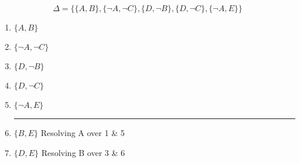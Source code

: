 \documentclass{article}
\begin{document}
 \section{}
 \[\Delta = \{\{A, B\}, \{\lnot A, \lnot C\}, \{D, \lnot B \}, \{D, \lnot C \}, \{\lnot A, E\}\}\]
  \renewcommand{\labelenumi}{\arabic{enumi}.}
 \begin{enumerate}
 \item $\{A, B\}$
 \item $\{\lnot A, \lnot C\}$
 \item $\{D, \lnot B \}$
 \item $\{D, \lnot C \}$
 \item $\{\lnot A, E \}$
 \newline
 \noindent\rule{4cm}{0.4pt}
 \item $\{B, E \}$ \quad Resolving A over 1 \& 5
 \item $\{D, E \}$ \quad Resolving B over 3 \& 6
 \end{enumerate}
 
\end{document}
